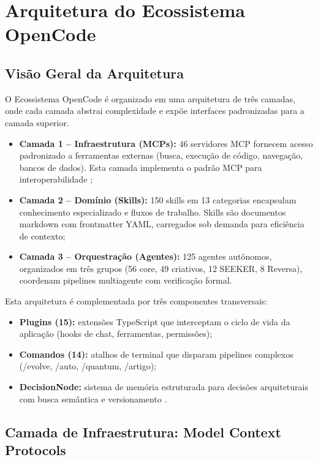 \documentclass[12pt,a4paper,sumario=tradicional]{abntex2}
\begin{document}
\chapter{Arquitetura do Ecossistema OpenCode}

\section{Visão Geral da Arquitetura}

O Ecossistema OpenCode é organizado em uma arquitetura de três camadas, onde cada camada abstrai complexidade e expõe interfaces padronizadas para a camada superior.

\begin{itemize}
    \item \textbf{Camada 1 -- Infraestrutura (MCPs):} 46 servidores MCP fornecem acesso padronizado a ferramentas externas (busca, execução de código, navegação, bancos de dados). Esta camada implementa o padrão MCP para interoperabilidade \cite{ayyagari2025mcp};
    \item \textbf{Camada 2 -- Domínio (Skills):} 150 skills em 13 categorias encapsulam conhecimento especializado e fluxos de trabalho. Skills são documentos markdown com frontmatter YAML, carregados sob demanda para eficiência de contexto;
    \item \textbf{Camada 3 -- Orquestração (Agentes):} 125 agentes autônomos, organizados em três grupos (56 core, 49 criativos, 12 SEEKER, 8 Reversa), coordenam pipelines multiagente com verificação formal.
\end{itemize}

Esta arquitetura é complementada por três componentes transversais:
\begin{itemize}
    \item \textbf{Plugins (15):} extensões TypeScript que interceptam o ciclo de vida da aplicação (hooks de chat, ferramentas, permissões);
    \item \textbf{Comandos (14):} atalhos de terminal que disparam pipelines complexos (/evolve, /auto, /quantum, /artigo);
    \item \textbf{DecisionNode:} sistema de memória estruturada para decisões arquiteturais com busca semântica e versionamento \cite{kruchten2009documentation}.
\end{itemize}

\section{Camada de Infraestrutura: Model Context Protocols}
\end{document}

